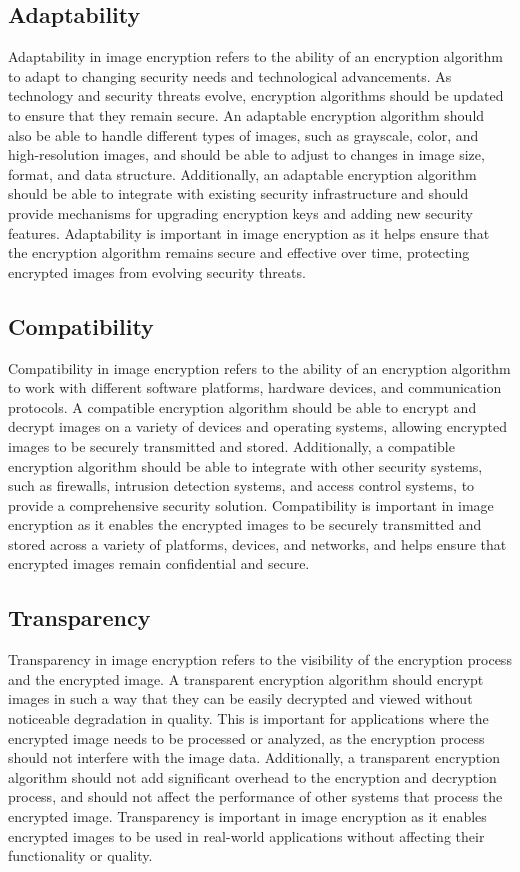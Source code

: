 \documentclass[11pt,a4paper,english]{article}
\begin{document}
\subsection{Adaptability}Adaptability in image encryption refers to the ability of an encryption algorithm to adapt to changing security needs and technological advancements. As technology and security threats evolve, encryption algorithms should be updated to ensure that they remain secure. An adaptable encryption algorithm should also be able to handle different types of images, such as grayscale, color, and high-resolution images, and should be able to adjust to changes in image size, format, and data structure. Additionally, an adaptable encryption algorithm should be able to integrate with existing security infrastructure and should provide mechanisms for upgrading encryption keys and adding new security features. Adaptability is important in image encryption as it helps ensure that the encryption algorithm remains secure and effective over time, protecting encrypted images from evolving security threats.
\subsection{Compatibility}Compatibility in image encryption refers to the ability of an encryption algorithm to work with different software platforms, hardware devices, and communication protocols. A compatible encryption algorithm should be able to encrypt and decrypt images on a variety of devices and operating systems, allowing encrypted images to be securely transmitted and stored. Additionally, a compatible encryption algorithm should be able to integrate with other security systems, such as firewalls, intrusion detection systems, and access control systems, to provide a comprehensive security solution. Compatibility is important in image encryption as it enables the encrypted images to be securely transmitted and stored across a variety of platforms, devices, and networks, and helps ensure that encrypted images remain confidential and secure.
\subsection{Transparency}Transparency in image encryption refers to the visibility of the encryption process and the encrypted image. A transparent encryption algorithm should encrypt images in such a way that they can be easily decrypted and viewed without noticeable degradation in quality. This is important for applications where the encrypted image needs to be processed or analyzed, as the encryption process should not interfere with the image data. Additionally, a transparent encryption algorithm should not add significant overhead to the encryption and decryption process, and should not affect the performance of other systems that process the encrypted image. Transparency is important in image encryption as it enables encrypted images to be used in real-world applications without affecting their functionality or quality.
\newpage
\end{document}
